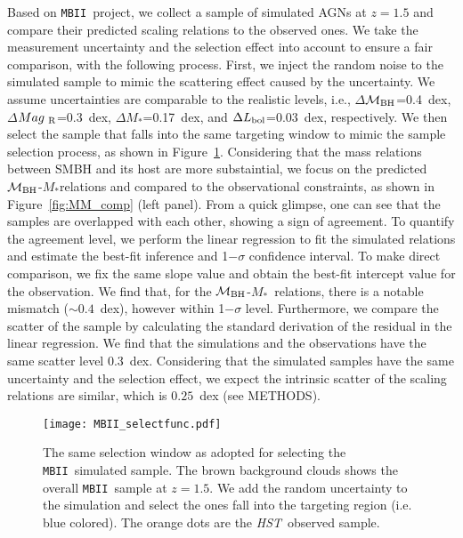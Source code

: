\documentclass{natureprintstyle}
\newcommand{\hst}{{\it HST}}
\newcommand{\mbh}{$\mathcal M_{\rm BH}$}
\newcommand{\mr}{$Mag_{\rm ~R}$}
\newcommand{\mstar}{{$M_*$}}
\newcommand{\mbii}{\texttt{MBII}}
\begin{document}
Based on \mbii\ project, we collect a sample of simulated AGNs at $z=1.5$ and compare their predicted scaling relations to the observed ones. We take the measurement uncertainty and the selection effect into account to ensure a fair comparison,  with the following process. First, we inject the random noise to the simulated sample to mimic the scattering effect caused by the uncertainty. We assume uncertainties are comparable to the realistic levels, i.e., $\Delta$\mbh =0.4~dex, $\Delta$\mr=0.3~dex, $\Delta$\mstar=0.17~dex, and $\Delta L_{\rm bol}$=0.03~dex, respectively. We then select the sample that falls into the same targeting window to mimic the sample selection process, as shown in Figure~\ref{fig:selectfunc}. Considering that the mass relations between SMBH and its host are more substaintial, we focus on the predicted \mbh-\mstar relations and compared to the observational constraints, as shown in Figure~\ref{fig:MM_comp} (left panel). From a quick glimpse, one can see that the samples are overlapped with each other, showing a sign of agreement. To quantify the agreement level, we perform the linear regression to fit the simulated relations and estimate the best-fit inference and 1$-\sigma$ confidence interval. To make direct comparison, we fix the same slope value and obtain the best-fit intercept value for the observation. We find that, for the \mbh-\mstar\ relations, there is a notable mismatch ($\sim0.4$~dex), however within 1$-\sigma$ level. Furthermore, we compare the scatter of the sample by calculating the standard derivation of the residual in the linear regression. We find that the simulations and the observations have the same scatter level $0.3$~dex. Considering that the simulated samples have the same uncertainty and the selection effect, we expect the intrinsic scatter of the scaling relations are similar, which is $0.25$~dex (see METHODS).

\begin{figure}[t]
\texttt{[image: MBII\_selectfunc.pdf]}
\caption{The same selection window as adopted for selecting the \mbii\ simulated sample. The brown background clouds shows the overall \mbii\ sample at $z=1.5$. We add the random uncertainty to the simulation and select the ones fall into the targeting region (i.e. blue colored). The orange dots are the \hst\ observed sample.}
\label{fig:selectfunc}
\end{figure}
\end{document}
